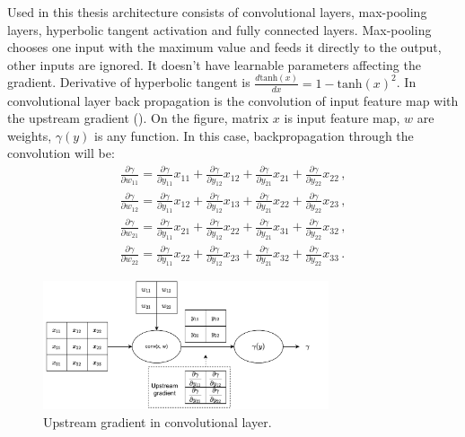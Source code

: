 Used in this thesis architecture consists of convolutional layers, max-pooling layers, hyperbolic tangent activation and fully connected layers. Max-pooling chooses one input with the maximum value and feeds it directly to the output, other inputs are ignored. It doesn't have learnable parameters affecting the gradient. Derivative of hyperbolic tangent is $\frac{d\textrm{tanh}(x)}{dx} = 1-\textrm{tanh}(x)^2$. In convolutional layer back propagation is the convolution of input feature map with the upstream gradient (). On the figure, matrix $x$ is input feature map, $w$ are weights, $\gamma(y)$ is any function. In this case, backpropagation through the convolution will be:
\begin{equation}
\begin{aligned}
	\frac{\partial \gamma}{\partial w_{11}} = \frac{\partial\gamma}{\partial y_{11}} x_{11} + \frac{\partial\gamma}{\partial y_{12}} x_{12} + \frac{\partial\gamma}{\partial y_{21}} x_{21} + \frac{\partial\gamma}{\partial y_{22}} x_{22}\,, \\
	\frac{\partial \gamma}{\partial w_{12}} = \frac{\partial\gamma}{\partial y_{11}} x_{12} + \frac{\partial\gamma}{\partial y_{12}} x_{13} + \frac{\partial\gamma}{\partial y_{21}} x_{22} + \frac{\partial\gamma}{\partial y_{22}} x_{23}\,, \\
	\frac{\partial \gamma}{\partial w_{21}} = \frac{\partial\gamma}{\partial y_{11}} x_{21} + \frac{\partial\gamma}{\partial y_{12}} x_{22} + \frac{\partial\gamma}{\partial y_{21}} x_{31} + \frac{\partial\gamma}{\partial y_{22}} x_{32}\,, \\
	\frac{\partial \gamma}{\partial w_{22}} = \frac{\partial\gamma}{\partial y_{11}} x_{22} + \frac{\partial\gamma}{\partial y_{12}} x_{23} + \frac{\partial\gamma}{\partial y_{21}} x_{32} + \frac{\partial\gamma}{\partial y_{22}} x_{33}\,.
\end{aligned}
\end{equation}



\begin{figure}[!h]

  \centering
  \includegraphics[width=0.75\textwidth]{./fig/photos/Conv_BP.pdf}
  \caption{Upstream gradient in convolutional layer.}
  \label{fig:conv_bp}
\end{figure}



